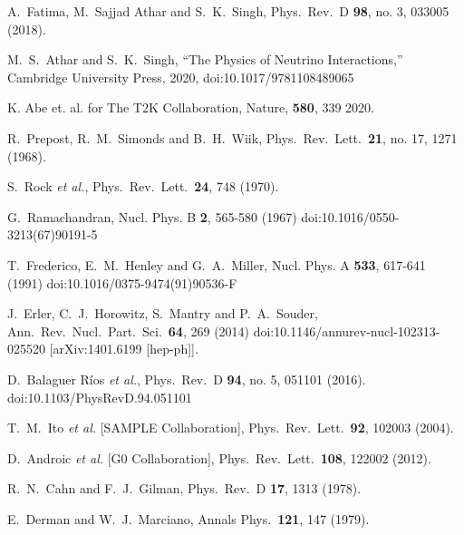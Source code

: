\begin{thebibliography}{00}
  

  A.~Fatima, M.~Sajjad Athar and S.~K.~Singh,
    Phys.\ Rev.\ D {\bf 98}, no. 3, 033005 (2018).
  
  

M.~S.~Athar and S.~K.~Singh,
``The Physics of Neutrino Interactions,'' Cambridge University Press, 2020, 
doi:10.1017/9781108489065
  

K. Abe et. al. for The T2K Collaboration, Nature, {\bf 580}, 339 2020.
  
  

  R.~Prepost, R.~M.~Simonds and B.~H.~Wiik,
    Phys.\ Rev.\ Lett.\  {\bf 21}, no. 17, 1271 (1968).
  
  

  S.~Rock {\it et al.},
    Phys.\ Rev.\ Lett.\  {\bf 24}, 748 (1970).
  
  

G.~Ramachandran,
Nucl. Phys. B \textbf{2}, 565-580 (1967)
doi:10.1016/0550-3213(67)90191-5

T.~Frederico, E.~M.~Henley and G.~A.~Miller,
Nucl. Phys. A \textbf{533}, 617-641 (1991)
doi:10.1016/0375-9474(91)90536-F
  
  

  J.~Erler, C.~J.~Horowitz, S.~Mantry and P.~A.~Souder,
    Ann.\ Rev.\ Nucl.\ Part.\ Sci.\  {\bf 64}, 269 (2014)
  doi:10.1146/annurev-nucl-102313-025520
  [arXiv:1401.6199 [hep-ph]].
      

  D.~Balaguer Ríos {\it et al.},
    Phys.\ Rev.\ D {\bf 94}, no. 5, 051101 (2016).
  doi:10.1103/PhysRevD.94.051101
      
  

  T.~M.~Ito {\it et al.} [SAMPLE Collaboration],
    Phys.\ Rev.\ Lett.\  {\bf 92}, 102003 (2004).
  
  

  D.~Androic {\it et al.} [G0 Collaboration],
    Phys.\ Rev.\ Lett.\  {\bf 108}, 122002 (2012).
  
  

  R.~N.~Cahn and F.~J.~Gilman,
    Phys.\ Rev.\ D {\bf 17}, 1313 (1978).
  
  

  E.~Derman and W.~J.~Marciano,
    Annals Phys.\  {\bf 121}, 147 (1979).
  

\end{thebibliography}

